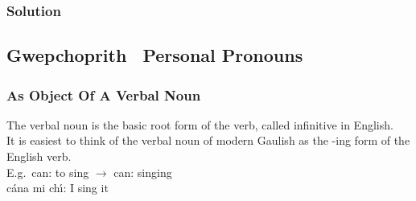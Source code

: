 \subsubsection{Solution}
\begin{table}[H]
\centering
{}
\label{solution_phrases_with_verbs}
\caption{Solution: phrases with verbs}
\end{table}



\subsection{Gwepchoprith \textendash\ Personal Pronouns}
\subsubsection{As Object Of A Verbal Noun}

The verbal noun is the basic root form of the verb, called infinitive in English.\\

It is easiest to think of the verbal noun of modern Gaulish as the -ing form of the English verb.\\

E.g.\ can: to sing $\rightarrow$ can: singing\\
c\'{a}na mi ch\'{\i}: I sing it\\

